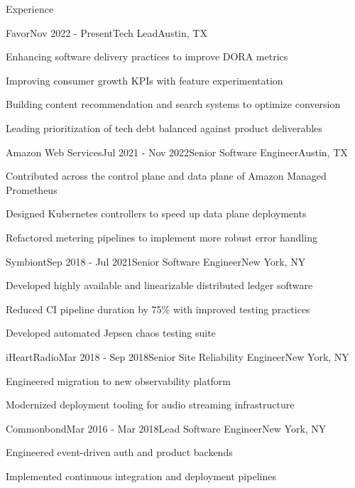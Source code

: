 \documentclass[
	11pt, %
]{resume} %
\begin{document}
\begin{rSection}{Experience}

	\begin{rSubsection}{Favor}{Nov 2022 - Present}{Tech Lead}{Austin, TX}
        \item Enhancing software delivery practices to improve DORA metrics
        \item Improving consumer growth KPIs with feature experimentation
        \item Building content recommendation and search systems to optimize conversion
        \item Leading prioritization of tech debt balanced against product deliverables
	\end{rSubsection}


    \begin{rSubsection}{Amazon Web Services}{Jul 2021 - Nov 2022}{Senior Software Engineer}{Austin, TX}
        \item Contributed across the control plane and data plane of Amazon Managed Prometheus
        \item Designed Kubernetes controllers to speed up data plane deployments
        \item Refactored metering pipelines to implement more robust error handling
    \end{rSubsection}

    \begin{rSubsection}{Symbiont}{Sep 2018 - Jul 2021}{Senior Software Engineer}{New York, NY}
        \item Developed highly available and linearizable distributed ledger software
        \item Reduced CI pipeline duration by 75\% with improved testing practices
        \item Developed automated Jepsen chaos testing suite
    \end{rSubsection}


    \begin{rSubsection}{iHeartRadio}{Mar 2018 - Sep 2018}{Senior Site Reliability Engineer}{New York, NY}
        \item Engineered migration to new observability platform
        \item Modernized deployment tooling for audio streaming infrastructure
    \end{rSubsection}


    \begin{rSubsection}{Commonbond}{Mar 2016 - Mar 2018}{Lead Software Engineer}{New York, NY}
        \item Engineered event-driven auth and product backends
        \item Implemented continuous integration and deployment pipelines
    \end{rSubsection}

\end{rSection}
\end{document}
